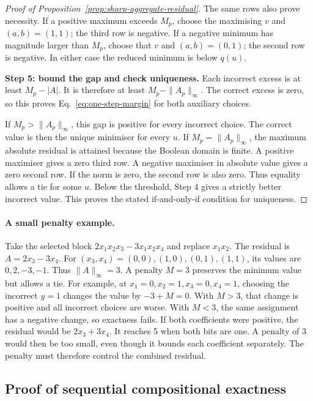 \documentclass[a4paper,onecolumn,11pt,unpublished]{quantumarticle}
\theoremstyle{remark}
\begin{document}
\begin{proof}[Proof of Proposition~\ref{prop:sharp-aggregate-residual}]
The same rows also prove necessity. If a positive maximum exceeds $M_p$,
choose the maximising $v$ and $(a,b)=(1,1)$; the third row is negative.
If a negative minimum has magnitude larger than $M_p$, choose that $v$
and $(a,b)=(0,1)$; the second row is negative.
In either case the reduced minimum is below $q(u)$.

\textbf{Step 5: bound the gap and check uniqueness.}
Each incorrect excess is at least $M_p-|A|$.
It is therefore at least $M_p-\|A_p\|_\infty$.
The correct excess is zero, so this proves
Eq.~\eqref{eq:one-step-margin} for both auxiliary choices.

If $M_p>\|A_p\|_\infty$, this gap is positive for every incorrect choice.
The correct value is then the unique minimiser for every $u$.
If $M_p=\|A_p\|_\infty$, the maximum absolute residual is attained because
the Boolean domain is finite. A positive maximiser gives a zero third row.
A negative maximiser in absolute value gives a zero second row.
If the norm is zero, the second row is also zero.
Thus equality allows a tie for some $u$.
Below the threshold, Step 4 gives a strictly better incorrect value.
This proves the stated if-and-only-if condition for uniqueness.
\end{proof}

\paragraph{A small penalty example.}
Take the selected block $2x_1x_2x_3-3x_1x_2x_4$ and replace $x_1x_2$.
The residual is $A=2x_3-3x_4$.
For $(x_3,x_4)=(0,0),(1,0),(0,1),(1,1)$, its values are
$0,2,-3,-1$. Thus $\|A\|_\infty=3$.
A penalty $M=3$ preserves the minimum value but allows a tie.
For example, at $x_1=0,x_2=1,x_3=0,x_4=1$, choosing the incorrect
$y=1$ changes the value by $-3+M=0$.
With $M>3$, that change is positive and all incorrect choices are worse.
With $M<3$, the same assignment has a negative change, so exactness fails.
If both coefficients were positive, the residual would be $2x_3+3x_4$.
It reaches 5 when both bits are one. A penalty of 3 would then be too small,
even though it bounds each coefficient separately.
The penalty must therefore control the combined residual.

\subsection{Proof of sequential compositional exactness}
\label{app:compositional-proof}
\end{document}

